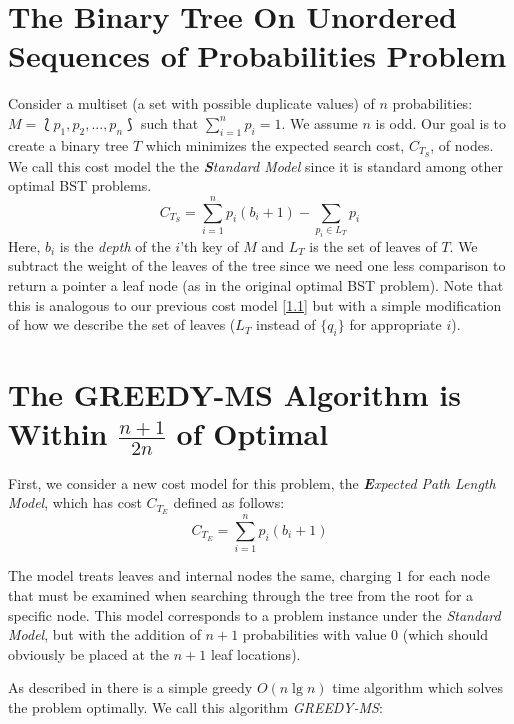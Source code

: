 \documentclass[letterpaper,12pt,titlepage,oneside,final]{book}
\theoremstyle{plain}
\begin{document}
\section{The Binary Tree On Unordered Sequences of Probabilities Problem}\label{The Multiset Binary Search Tree Problem}

 Consider a multiset (a set with possible duplicate values) of $n$ probabilities: $M = \lbag p_1, p_2, ..., p_n \rbag$ such that $\sum\limits_{i=1}^n p_i = 1$. We assume $n$ is odd. Our goal is to create a binary tree $T$ which minimizes the expected search cost, $C_{T_S}$, of nodes. We call this cost model the  the \textit{\textbf{S}tandard Model} since it is standard among other optimal BST problems.
\begin{equation}
C_{T_S} = \sum_{i=1}^{n} p_i(b_i+1) - \sum_{p_i \in L_T} p_i
\end{equation}
Here, $b_i$ is the \emph{depth} of the $i$'th key of $M$ and $L_T$ is the set of leaves of $T$. We subtract the weight of the leaves of the tree since we need one less comparison to return a pointer a leaf node (as in the original optimal BST problem). Note that this is analogous to our previous cost model \ref{1.1} but with a simple modification of how we describe the set of leaves ($L_T$ instead of $\{q_i\}$ for appropriate $i$).

\section{The GREEDY-MS Algorithm is Within $\frac{n+1}{2n}$ of Optimal}\label{GREEDY-MS}

First, we consider a new cost model for this problem, the \textit{\textbf{E}xpected Path Length Model}, which has cost $C_{T_E}$ defined as follows:
\begin{equation}
C_{T_E} = \sum_{i=1}^{n} p_i(b_i+1)
\end{equation}

The model treats leaves and internal nodes the same, charging $1$ for each node that must be examined when searching through the tree from the root for a specific node. This model corresponds to a problem instance under the \textit{Standard Model}, but with the addition of $n+1$ probabilities with value $0$ (which should obviously be placed at the $n+1$ leaf locations).

As described in \cite{golin2012huffman} there is a simple greedy $O(n \lg n)$ time algorithm which solves the problem optimally. We call this algorithm \textit{GREEDY-MS}:
\end{document}

